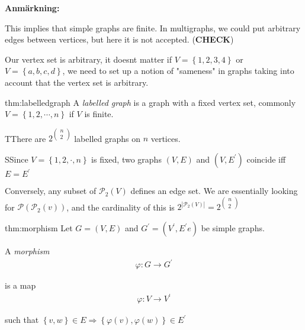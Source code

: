 \par\bigskip
\noindent\textbf{Anmärkning:}\par
\noindent This implies that simple graphs are finite. In multigraphs, we could put arbitrary edges between vertices, but here it is not accepted. (\textbf{CHECK})
\par\bigskip
\noindent Our vertex set is arbitrary, it doesnt matter if $V=\left\{1,2,3,4\right\}$ or $V = \left\{a,b,c,d\right\}$, we need to set up a notion of "sameness" in graphs taking into account that the vertex set is arbitrary.
\par\bigskip
\begin{theo}{thm:labelledgraph}
A \textit{labelled graph} is a graph with a fixed vertex set, commonly $V = \left\{1,2,\cdots,n\right\}$ if $V$ is finite.
\end{theo}
\newpage
\begin{lem}
  TThere are $2^{\begin{pmatrix}n\\2\end{pmatrix}}$ labelled graphs on $n$ vertices.
\end{lem}
\par\bigskip
\begin{prf}
  SSince $V = \left\{1,2,\cdot,n\right\}$ is fixed, two graphs $(V,E)$ and $(V,E^{\prime})$ coincide iff $E=E^{\prime}$
  \par\bigskip
  \noindent Conversely, any subset of $\mathcal{P}_2(V)$ defines an edge set. We are essentially looking for $\mathcal{P}(\mathcal{P}_2(v))$, and the cardinality of this is $2^{\left|\mathcal{P}_2(V)\right|} = 2^{\begin{pmatrix}n\\2\end{pmatrix}}$
\end{prf}
\par\bigskip
\begin{theo}[Morphism]{thm:morphism}
  Let $G = (V,E)$ and $G^{\prime} = (V^{\prime}, E^{\prime}e)$ be simple graphs.\par
  \noindent A \textit{morphism}
  \begin{equation*}
    \begin{gathered}
      \varphi:G\to G^{\prime}
    \end{gathered}
  \end{equation*}\par
  \noindent is a map
  \begin{equation*}
    \begin{gathered}
      \varphi:V\to V^{\prime}
    \end{gathered}
  \end{equation*}\par
\noindent such that $\left\{v,w\right\}\in E\Rightarrow \left\{\varphi(v),\varphi(w)\right\}\in E^{\prime}$
\end{theo}
